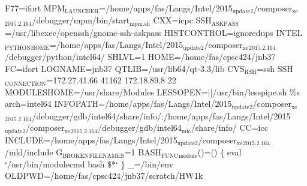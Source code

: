 \documentclass[11pt]{article}
\begin{document}
F77=ifort
MPM\(_{\text{LAUNCHER}}\)=/home/apps/fas/Langs/Intel/2015\(_{\text{update2}}\)/composer\(_{\text{xe}}\)\(_{\text{2015.2.164}}\)/debugger/mpm/bin/start\(_{\text{mpm.sh}}\)
CXX=icpc
SSH\(_{\text{ASKPASS}}\)=/usr/libexec/openssh/gnome-ssh-askpass
HISTCONTROL=ignoredups
INTEL\(_{\text{PYTHONHOME}}\)=/home/apps/fas/Langs/Intel/2015\(_{\text{update2}}\)/composer\(_{\text{xe}}\)\(_{\text{2015.2.164}}\)/debugger/python/intel64/
SHLVL=1
HOME=/home/fas/cpsc424/jnb37
FC=ifort
LOGNAME=jnb37
QTLIB=/usr/lib64/qt-3.3/lib
CVS\(_{\text{RSH}}\)=ssh
SSH\(_{\text{CONNECTION}}\)=172.27.41.66 41162 172.18.89.8 22
MODULESHOME=/usr/share/Modules
LESSOPEN=||/usr/bin/lesspipe.sh \%s
arch=intel64
INFOPATH=/home/apps/fas/Langs/Intel/2015\(_{\text{update2}}\)/composer\(_{\text{xe}}\)\(_{\text{2015.2.164}}\)/debugger/gdb/intel64/share/info/:/home/apps/fas/Langs/Intel/2015\(_{\text{update2}}\)/composer\(_{\text{xe}}\)\(_{\text{2015.2.164}}\)/debugger/gdb/intel64\(_{\text{mic}}\)/share/info/
CC=icc
INCLUDE=/home/apps/fas/Langs/Intel/2015\(_{\text{update2}}\)/composer\(_{\text{xe}}\)\(_{\text{2015.2.164}}\)/mkl/include
G\(_{\text{BROKEN}}\)\(_{\text{FILENAMES}}\)=1
BASH\(_{\text{FUNC}}\)\(_{\text{module}}\)()=() \{  eval `/usr/bin/modulecmd bash \$*`
\}
\_=/bin/env
OLDPWD=/home/fas/cpsc424/jnb37/scratch/HW1k
\end{document}
